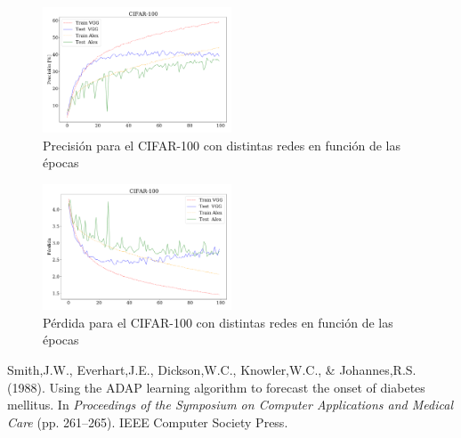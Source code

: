 \begin{figure}[H]
    \begin{small}
        \begin{center}
            \includegraphics[width=0.5\textwidth]{Graphs/ejer10_acc_cifar100.pdf}
        \end{center}
        \caption{Precisión para el CIFAR-100 con distintas redes en función de las épocas}
        \label{fig:ejer10_acc_cifar100}
    \end{small}
\end{figure}
\vfill\eject
\begin{figure}[H]
    \begin{small}
        \begin{center}
            \includegraphics[width=0.5\textwidth]{Graphs/ejer10_loss_cifar100.pdf}
        \end{center}
        \caption{Pérdida para el CIFAR-100 con distintas redes en función de las épocas}
        \label{fig:ejer10_loss_cifar100}
    \end{small}
\end{figure}

\begin{thebibliography}{99}


 Smith,J.W., Everhart,J.E., Dickson,W.C., Knowler,W.C., \& Johannes,R.S. (1988). Using the ADAP learning algorithm to forecast
the onset of diabetes mellitus.  In {\it Proceedings of the Symposium on Computer Applications and Medical Care} (pp. 261--265).  IEEE
Computer Society Press.
\end{thebibliography}


